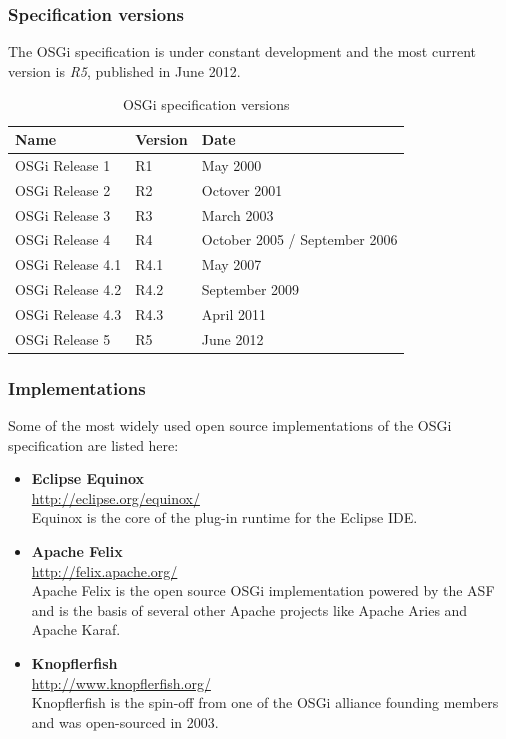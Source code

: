 \newpage
\subsubsection{Specification versions}
The \gls{OSGi} specification is under constant development and the most current version is \textit{R5}, published in June 2012.

\begin{table}[H]
\centering
\begin{tabular*}{\textwidth}{ l l l }
	\toprule
	Name & Version & Date \\
	\midrule
	OSGi Release 1 & R1 & May 2000 \\
	OSGi Release 2 & R2 & Octover 2001 \\
	OSGi Release 3 & R3 & March 2003 \\
	OSGi Release 4 & R4 & October 2005 / September 2006 \\
	OSGi Release 4.1 & R4.1 & May 2007 \\
	OSGi Release 4.2 & R4.2 & September 2009 \\
	OSGi Release 4.3 & R4.3 & April 2011 \\
	OSGi Release 5 & R5 & June 2012 \\
	\bottomrule
\end{tabular*}
\caption{OSGi specification versions}
\end{table}

\subsubsection{Implementations}
Some of the most widely used open source implementations of the \gls{OSGi} specification are listed here: 

\begin{itemize}
	\item \textbf{Eclipse Equinox} \\
		\url{http://eclipse.org/equinox/} \\
		Equinox is the core of the plug-in runtime for the Eclipse IDE.
	\item \textbf{Apache Felix} \\
		\url{http://felix.apache.org/} \\
		Apache Felix is the open source \gls{OSGi} implementation powered by the \gls{ASF} and is the basis of several other Apache projects like Apache Aries and Apache Karaf.
	\item \textbf{Knopflerfish} \\
		\url{http://www.knopflerfish.org/} \\
		Knopflerfish is the spin-off from one of the \gls{OSGi} alliance founding members and was open-sourced in 2003.
\end{itemize}
